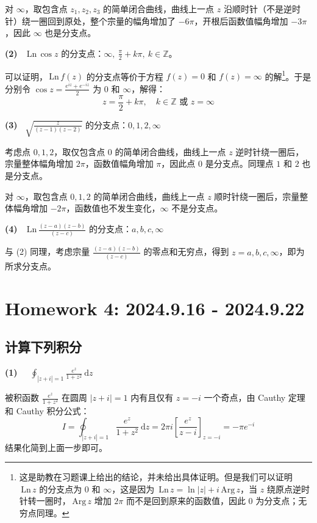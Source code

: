 \documentclass[UTF8]{report}
\def\Ln{\mathrm{\,Ln\,}}
\def\Arg{\mathrm{\,Arg\,}}
\def\Z{\mathbb{Z}}
\theoremstyle{MyLineTheoremStyle} %
\theoremstyle{MyBlockTheoremStyle} %
\theoremstyle{MySubsubsectionStyle} %
\begin{document}
对 $\infty$，取包含点 $z_1, z_2, z_3 $ 的简单闭合曲线，曲线上一点 $z$ 沿顺时针（不是逆时针）绕一圈回到原处，整个宗量的幅角增加了 $-6\pi$，开根后函数值幅角增加 $-3\pi$，因此 $\infty$ 也是分支点。

\textbf{(2)\ } $\Ln \cos z$ 的分支点：$\infty,\ \frac{\pi}{2} + k\pi,\ k \in \Z$。

可以证明，$\Ln f(z)$ 的分支点等价于方程 $f(z) = 0$ 和 $f(z) = \infty$ 的解\footnote{这是助教在习题课上给出的结论，并未给出具体证明。但是我们可以证明 $\Ln z$ 的分支点为 $0$ 和 $\infty$，这是因为 $\Ln z = \ln | z | + i\Arg z$，当 $z$ 绕原点逆时针转一圈时，$\Arg z$ 增加 $2\pi$ 而不是回到原来的函数值，因此 0 为分支点；无穷点同理。}。于是分别令 $\cos z = \frac{e^{iz} + e^{-iz}}{2}$ 为 $0$ 和 $\infty$，解得：
\begin{equation}
z = \frac{\pi}{2} + k\pi, \quad k \in \Z \text{ 或 } z = \infty
\end{equation}

\textbf{(3)\ } $\sqrt{\frac{z}{(z-1)(z-2)}} $ 的分支点：$0, 1, 2, \infty$

考虑点 $0,1,2$，取仅包含点 $0$ 的简单闭合曲线，曲线上一点 $z$ 逆时针绕一圈后，宗量整体幅角增加 $2\pi$，函数值幅角增加 $\pi$，因此点 $0$ 是分支点。同理点 $1$ 和 $2$ 也是分支点。

对 $\infty$，取包含点 $0,1,2$ 的简单闭合曲线，曲线上一点 $z$ 顺时针绕一圈后，宗量整体幅角增加 $-2\pi$，函数值也不发生变化，$\infty$ 不是分支点。

\textbf{(4)\ } $\Ln \frac{(z-a)(z-b)}{(z-c)}$ 的分支点：$a,b,c, \infty$

与 (2) 同理，考虑宗量 $\frac{(z-a)(z-b)}{(z-c)}$ 的零点和无穷点，得到 $z = a,b,c, \infty$，即为所求分支点。

\chapter{Homework 4: 2024.9.16 - 2024.9.22}
\thispagestyle{fancy}

\section{计算下列积分}

\textbf{(1)\ \ } $\displaystyle \oint_{| z + i | = 1} \frac{e^z}{1 + z^2} \ \mathrm{d} z$

被积函数 $\frac{e^z}{1 + z^2}$ 在圆周 $| z + i | = 1$ 内有且仅有 $z = -i$ 一个奇点，由 Cauthy 定理和 Cauthy 积分公式：
\begin{equation}
I =  \oint_{| z + i | = 1} \frac{e^z}{1 + z^2} \ \mathrm{d} z = 2 \pi i\left[\frac{ e^z}{z - i} \right]_{z = -i} = - \pi e^{-i}
\end{equation}
结果化简到上面一步即可。
\end{document}
